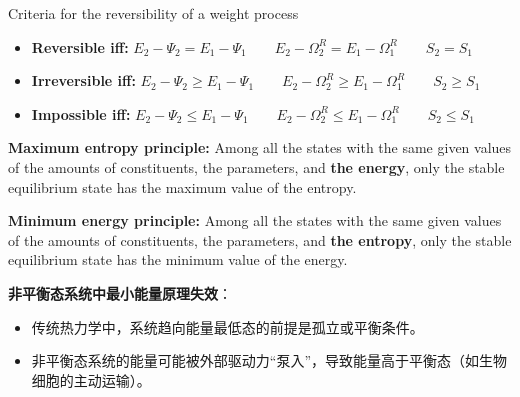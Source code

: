 \begin{corollary}
    Criteria for the reversibility of a weight process
    \begin{itemize}
        \item \textbf{Reversible iff:} \( E_2 - \Psi_2 = E_1 - \Psi_1 \qquad
        E_2 - \Omega^R_2 = E_1 - \Omega^R_1 \qquad S_2=S_1\)
        \item \textbf{Irreversible iff:} \( E_2 - \Psi_2 \geq E_1 - \Psi_1 \qquad
        E_2 - \Omega^R_2 \geq E_1 - \Omega^R_1 \qquad S_2\geq S_1 \)
        \item \textbf{Impossible iff:} \( E_2 - \Psi_2 \leq E_1 - \Psi_1 \qquad
        E_2 - \Omega^R_2 \leq E_1 - \Omega^R_1 \qquad S_2\leq S_1 \)
    \end{itemize}
\end{corollary}
\begin{principle}

\textbf{Maximum entropy principle:} Among all the states with the same given values of the amounts of constituents, the parameters, and \textbf{the energy}, only the stable equilibrium state has the maximum value of the entropy.

\textbf{Minimum energy principle:} Among all the states with the same given values of the amounts of constituents, the parameters, and \textbf{the entropy}, only the stable equilibrium state has the minimum value of the energy.
\begin{add}
    \textbf{非平衡态系统中最小能量原理失效}：
        \begin{itemize}
            \item 传统热力学中，系统趋向能量最低态的前提是孤立或平衡条件。
            \item 非平衡态系统的能量可能被外部驱动力“泵入”，导致能量高于平衡态（如生物细胞的主动运输）。
        \end{itemize}
\end{add}
\end{principle}
